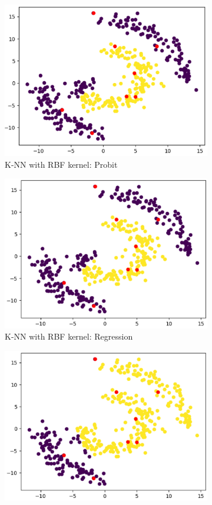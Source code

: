 \documentclass[12pt]{amsart}
\begin{document}
\begin{figure}[ht]
\begin{subfigure}{0.475\linewidth}
    \includegraphics[width=0.8\linewidth]{Figures/SpiKNNRBFPro.png} 
    \caption{K-NN with RBF kernel: Probit} 
    \label{Fig:SpiKNNRBFPro} 
  \end{subfigure} 
      \begin{subfigure}{0.475\linewidth}
    \centering
    \includegraphics[width=0.8\linewidth]{Figures/SpiKNNRBFReg.png} 
    \caption{K-NN with RBF kernel: Regression} 
    \label{Fig:SpiKNNRBFReg} 
  \end{subfigure}
      \begin{subfigure}{0.475\linewidth}
    \centering
    \includegraphics[width=0.8\linewidth]{Figures/SpiProxPro.png} 

\end{subfigure}
\end{figure}
\end{document}
